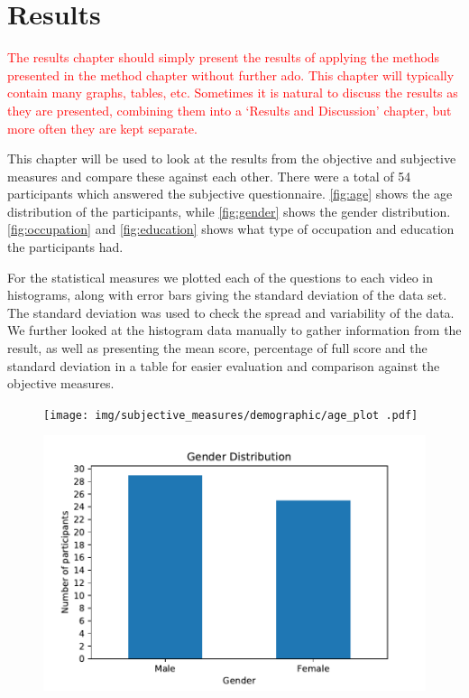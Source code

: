 \chapter{Results}\label{cha:results}
%
\textcolor{red}{The results chapter should simply present the results of applying the methods presented in the method chapter without further ado. This chapter will typically contain many graphs, tables, etc. Sometimes it is natural to discuss the results as they are presented, combining them into a `Results and Discussion' chapter, but more often they are kept separate.}

This chapter will be used to look at the results from the objective and subjective measures and compare these against each other. There were a total of 54 participants which answered the subjective questionnaire. \autoref{fig:age} shows the age distribution of the participants, while \autoref{fig:gender} shows the gender distribution. \autoref{fig:occupation} and \autoref{fig:education} shows what type of occupation and education the participants had. 

For the statistical measures we plotted each of the questions to each video in histograms, along with error bars giving the standard deviation of the data set. The standard deviation was used to check the spread and variability of the data. We further looked at the histogram data manually to gather information from the result, as well as presenting the mean score, percentage of full score and the standard deviation in a table for easier evaluation and comparison against the objective measures.

\begin{figure}
\centering
\begin{minipage}{.5\textwidth}
  \centering
  \texttt{[image: img/subjective\_measures/demographic/age\_plot .pdf]}
  \label{fig:age}
\end{minipage}%
\begin{minipage}{.5\textwidth}
  \centering
  \includegraphics[width=\linewidth]{img/subjective_measures/demographic/gender_plot.pdf}
  \label{fig:gender}
\end{minipage}
\end{figure}


